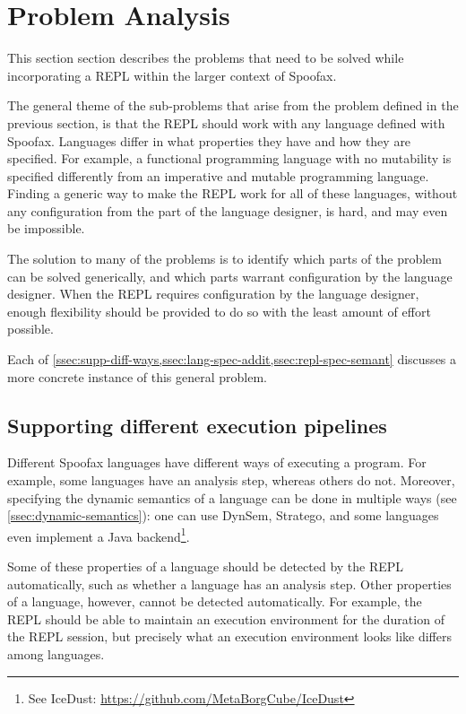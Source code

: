 \section{Problem Analysis}
\label{sec:problem-analysis}
This section section describes the problems that need to be solved while
incorporating a REPL within the larger context of Spoofax.

The general theme of the sub-problems that arise from the problem
defined in the previous section, is that the REPL should work
with any language defined with Spoofax. Languages differ in what
properties they have and how they are specified. For example, a
functional programming language with no mutability is specified
differently from an imperative and mutable programming
language. Finding a generic way to make the REPL work for all of these
languages, without any configuration from the part of the language
designer, is hard, and may even be impossible.

The solution to many of the problems is to identify which parts of the problem
can be solved generically, and which parts warrant configuration by the
language designer. When the REPL requires configuration by the language
designer, enough flexibility should be provided to do so with the least amount
of effort possible.

Each of \cref{ssec:supp-diff-ways,ssec:lang-spec-addit,ssec:repl-spec-semant}
discusses a more concrete instance of this general problem.

\subsection{Supporting different execution pipelines}
\label{ssec:supp-diff-ways}
Different Spoofax languages have different ways of executing a program.
For example, some languages have an analysis step, whereas
others do not. Moreover, specifying the dynamic semantics of a language
can be done in multiple ways (see \cref{ssec:dynamic-semantics}): one
can use DynSem, Stratego, and some languages even implement a Java
backend\footnote{See IceDust:
  \url{https://github.com/MetaBorgCube/IceDust}}.

Some of these properties of a language should be detected by the REPL
automatically, such as whether a language has an analysis step.
Other properties of a language, however, cannot be detected
automatically. For example, the REPL should be able to maintain an
execution environment for the duration of the REPL session, but
precisely what an execution environment looks like differs among
languages.

